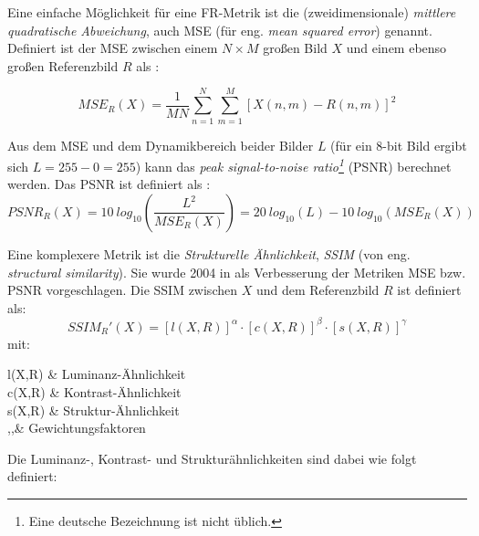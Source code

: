 Eine einfache Möglichkeit für eine FR-Metrik ist die (zweidimensionale) \textit{mittlere quadratische Abweichung}, auch MSE (für eng. \textit{mean squared error}) genannt. Definiert ist der MSE zwischen einem $N \times M$ großen Bild $X$ und einem ebenso großen Referenzbild $R$ als \cite{Tan2013}:

\begin{equation}
	MSE_R(X)=\frac{1}{M N} \sum_{n=1}^{N} \sum_{m=1}^{M} [X(n,m) - R(n,m)]^2
\end{equation}

Aus dem MSE und dem Dynamikbereich beider Bilder $L$ (für ein 8-bit Bild ergibt sich $L=255-0=255$) kann das \textit{peak signal-to-noise ratio\footnote{Eine deutsche Bezeichnung ist nicht üblich.}} (PSNR) berechnet werden. Das PSNR ist definiert als \cite{Bondzulic2016}:
\begin{equation}
	PSNR_R(X)= 10\: log_{10}\left(\frac{L^2}{MSE_R(X)}\right) = 20\: log_{10}(L) - 10\: log_{10}(MSE_R(X))
\end{equation}

Eine komplexere Metrik ist die \textit{Strukturelle Ähnlichkeit}, \textit{SSIM} (von eng. \textit{structural similarity}). Sie wurde 2004 in \cite{Wang2004} als Verbesserung der Metriken MSE bzw. PSNR vorgeschlagen. Die SSIM zwischen $X$ und dem Referenzbild $R$ ist definiert als:
\begin{equation}
	SSIM_R'(X)=[l(X,R)]^\alpha\cdot[c(X,R)]^\beta\cdot[s(X,R)]^\gamma
\end{equation}
mit:
\begin{with}
	l(X,R) & Luminanz-Ähnlichkeit\\
	c(X,R) & Kontrast-Ähnlichkeit\\
	s(X,R) & Struktur-Ähnlichkeit\\
	\alpha,\beta,\gamma & Gewichtungsfaktoren \\
\end{with}

Die Luminanz-, Kontrast- und Strukturähnlichkeiten sind dabei wie folgt definiert:

